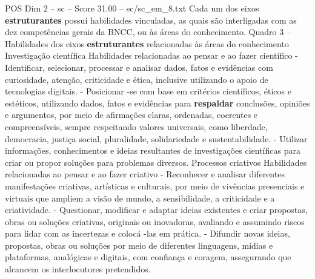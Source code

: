 \begin{textsample}{POS Dim 2 – sc – Score 31.00 – sc/sc\_em\_8.txt}
Cada um dos eixos \textbf{estruturantes} possui habilidades vinculadas, as quais são interligadas com as dez competências gerais da BNCC, ou às áreas do conhecimento.
Quadro 3 – Habilidades dos eixos \textbf{estruturantes} relacionadas às áreas do conhecimento Investigação científica Habilidades relacionadas ao pensar e ao fazer científico - Identificar, selecionar, processar e analisar dados, fatos e evidências com curiosidade, atenção, criticidade e ética, inclusive utilizando o apoio de tecnologias digitais. - Posicionar -se com base em critérios científicos, éticos e estéticos, utilizando dados, fatos e evidências para \textbf{respaldar} conclusões, opiniões e argumentos, por meio de afirmações claras, ordenadas, coerentes e compreensíveis, sempre respeitando valores universais, como liberdade, democracia, justiça social, pluralidade, solidariedade e sustentabilidade. - Utilizar informações, conhecimentos e ideias resultantes de investigações científicas para criar ou propor soluções para problemas diversos.
Processos criativos Habilidades relacionadas ao pensar e ao fazer criativo - Reconhecer e analisar diferentes manifestações criativas, artísticas e culturais, por meio de vivências presenciais e virtuais que ampliem a visão de mundo, a sensibilidade, a criticidade e a criatividade. - Questionar, modificar e adaptar ideias existentes e criar propostas, obras ou soluções criativas, originais ou inovadoras, avaliando e assumindo riscos para lidar com as incertezas e colocá -las em prática. - Difundir novas ideias, propostas, obras ou soluções por meio de diferentes linguagens, mídias e plataformas, analógicas e digitais, com confiança e coragem, assegurando que alcancem os interlocutores pretendidos.

\end{textsample}
